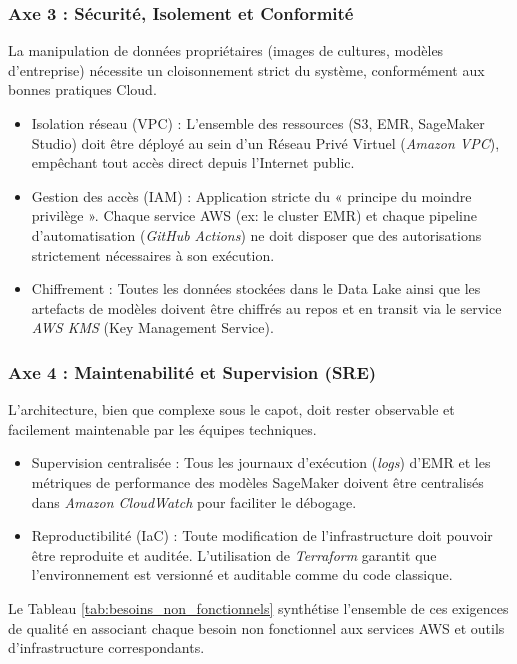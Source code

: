 \subsubsection{Axe 3 : Sécurité, Isolement et Conformité}
La manipulation de données propriétaires (images de cultures, modèles d'entreprise) nécessite un cloisonnement strict du système, conformément aux bonnes pratiques Cloud.
\begin{itemize}
    \item[$\bullet$] Isolation réseau (VPC) : L'ensemble des ressources (S3, EMR, SageMaker Studio) doit être déployé au sein d'un Réseau Privé Virtuel (\textit{Amazon VPC}), empêchant tout accès direct depuis l'Internet public.
    \item[$\bullet$] Gestion des accès (IAM) : Application stricte du « principe du moindre privilège ». Chaque service AWS (ex: le cluster EMR) et chaque pipeline d'automatisation (\textit{GitHub Actions}) ne doit disposer que des autorisations strictement nécessaires à son exécution.
    \item[$\bullet$] Chiffrement : Toutes les données stockées dans le Data Lake ainsi que les artefacts de modèles doivent être chiffrés au repos et en transit via le service \textit{AWS KMS} (Key Management Service).
\end{itemize}

\subsubsection{Axe 4 : Maintenabilité et Supervision (SRE)}
L'architecture, bien que complexe sous le capot, doit rester observable et facilement maintenable par les équipes techniques.
\begin{itemize}
    \item[$\bullet$] Supervision centralisée : Tous les journaux d'exécution (\textit{logs}) d'EMR et les métriques de performance des modèles SageMaker doivent être centralisés dans \textit{Amazon CloudWatch} pour faciliter le débogage.
    \item[$\bullet$] Reproductibilité (IaC) : Toute modification de l'infrastructure doit pouvoir être reproduite et auditée. L'utilisation de \textit{Terraform} garantit que l'environnement est versionné et auditable comme du code classique.
\end{itemize}

\vspace{0.3cm}
Le Tableau \ref{tab:besoins_non_fonctionnels} synthétise l'ensemble de ces exigences de qualité en associant chaque besoin non fonctionnel aux services AWS et outils d'infrastructure correspondants.

